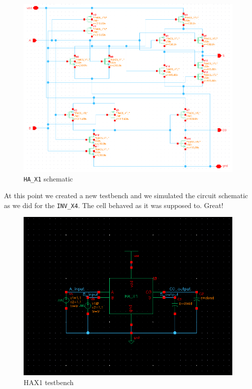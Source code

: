 \documentclass[a4paper]{article}
\newcommand{\inv}{\texttt{INV\_X4}\xspace}
\newcommand{\ha}{\texttt{HA\_X1}\xspace}
\begin{document}
\begin{figure}[H]
      \centering
       \includegraphics[width=\linewidth]{./Images/HA/HAX1_schematic.png}
\caption{\ha schematic}
\label{fig: HAX1_sch}
\end{figure}

At this point we created a new testbench and we simulated the circuit schematic as we did for the \inv. The cell behaved as it was supposed to. Great!

\begin{figure}[H]
      \centering
       \includegraphics[width=12cm]{./Images/HA/HAX1_TB_schematic.png}
\caption{HAX1 testbench}
\label{fig: HAX1_tb}
\end{figure}
\end{document}
